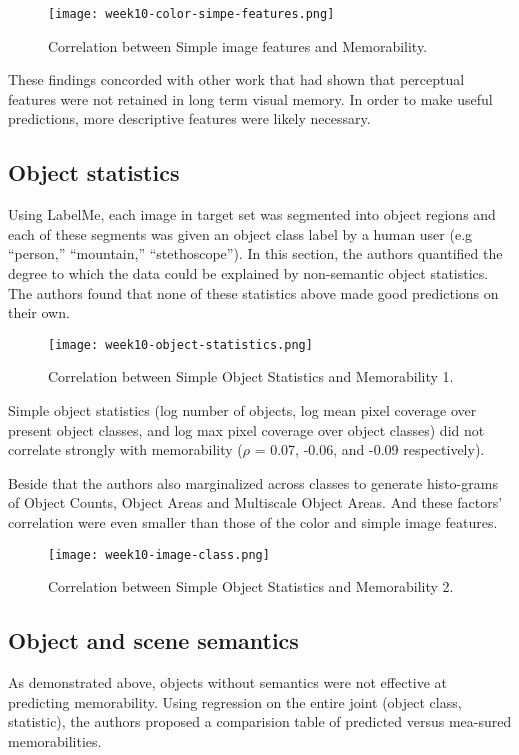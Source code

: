 \begin{figure}[!ht]
\centering
\texttt{[image: week10-color-simpe-features.png]}
\caption{Correlation between Simple image features and Memorability.}
\end{figure}

These findings concorded with other work that had shown that perceptual features were not retained in long term visual memory\cite{simplefeatures}. In order to make useful predictions, more descriptive features were likely necessary.

\subsection{Object statistics}
Using LabelMe\cite{labelme}, each image in target set was segmented into object regions and each of these segments was given an object class label by a human user (e.g “person,” “mountain,” “stethoscope”). In this section, the authors quantified the degree to which the data could be explained by non-semantic object statistics. The authors found that none of these statistics above made good predictions on their own. 

\begin{figure}[!ht]
\centering
\texttt{[image: week10-object-statistics.png]}
\caption{Correlation between Simple Object Statistics and Memorability 1.}
\end{figure}
    
Simple object statistics (log number of objects, log mean pixel coverage over present object classes, and log max pixel coverage over object classes) did not correlate strongly with memorability ($\rho$ = 0.07, -0.06, and -0.09 respectively).

Beside that the authors also marginalized across classes to generate histo-grams of Object Counts, Object Areas and Multiscale Object Areas. And these factors' correlation were even smaller than those of the color and simple image features.

\begin{figure}[!ht]
\centering
\texttt{[image: week10-image-class.png]}
\caption{Correlation between Simple Object Statistics and Memorability 2.}
\end{figure}

\subsection{Object and scene semantics}
As demonstrated above, objects without semantics were not effective at predicting memorability. Using regression on the entire joint (object class, statistic), the authors proposed a comparision table of predicted versus mea-sured memorabilities.


